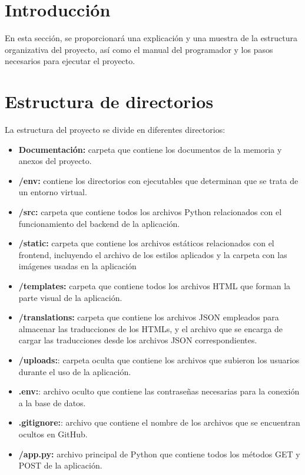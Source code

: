 
\section{Introducción}
En esta sección, se proporcionará una explicación y una muestra de la estructura organizativa del proyecto, así como el manual del programador y los pasos necesarios para ejecutar el proyecto.

\section{Estructura de directorios}
La estructura del proyecto se divide en diferentes directorios:

\begin{itemize}
    \item \textbf{Documentación:} carpeta que contiene los documentos de la memoria y anexos del proyecto.
    \item \textbf{/env:} contiene los directorios con ejecutables que determinan que se trata de un entorno virtual.
    \item \textbf{/src:} carpeta que contiene todos los archivos Python relacionados con el funcionamiento del backend de la aplicación.
    \item \textbf{/static:} carpeta que contiene los archivos estáticos relacionados con el frontend, incluyendo el archivo de los estilos aplicados y la carpeta con las imágenes usadas en la aplicación
    \item \textbf{/templates:} carpeta que contiene todos los archivos HTML que forman la parte visual de la aplicación.
    \item \textbf{/translations:} carpeta que contiene los archivos JSON empleados para almacenar las traducciones de los HTMLs, y el archivo que se encarga de cargar las traducciones desde los archivos JSON correspondientes.
    \item \textbf{/uploads:}: carpeta oculta que contiene los archivos que subieron los usuarios durante el uso de la aplicación.
    \item \textbf{.env:}: archivo oculto que contiene las contraseñas necesarias para la conexión a la base de datos.
    \item \textbf{.gitignore:}: archivo que contiene el nombre de los archivos que se encuentran ocultos en GitHub.
    \item \textbf{/app.py:} archivo principal de Python que contiene todos los métodos GET y POST de la aplicación. 

\end{itemize}
